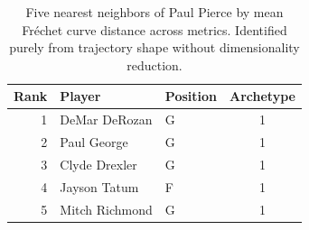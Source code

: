 \begin{table}[htbp]
  \centering\small
  \begin{tabular}{rllc}
    \toprule
    Rank & Player & Position & Archetype \\
    \midrule
    1 & DeMar DeRozan & G & 1 \\
    2 & Paul George & G & 1 \\
    3 & Clyde Drexler & G & 1 \\
    4 & Jayson Tatum & F & 1 \\
    5 & Mitch Richmond & G & 1 \\
    \bottomrule
  \end{tabular}
  \caption{Five nearest neighbors of Paul Pierce by mean Fr\'{e}chet curve distance across metrics. Identified purely from trajectory shape without dimensionality reduction.}
  \label{tab:Paul_Pierce_frechet_curve_neighbors}
\end{table}

